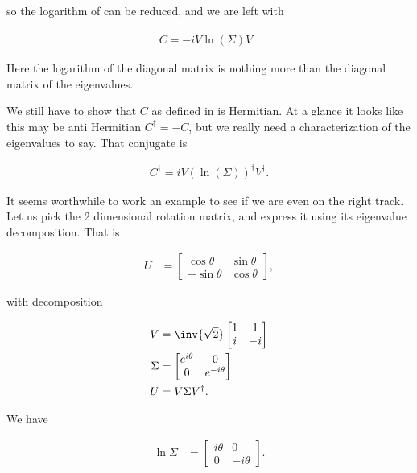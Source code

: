 so the logarithm of  can be reduced, and we are left with

\begin{align}\label{eqn:desaiDiracNotes:11}
C = -i V \ln ( \Sigma ) V^\dagger.
\end{align}

Here the logarithm of the diagonal matrix is nothing more than the diagonal matrix of the eigenvalues.

We still have to show that $C$ as defined in  is Hermitian.  At a glance it looks like this may be anti Hermitian $C^\dagger = -C$, but we really need a characterization of the eigenvalues to say.  That conjugate is

\begin{align}\label{eqn:desaiDiracNotes:11b}
C^\dagger = i V (\ln ( \Sigma ))^\dagger V^\dagger.
\end{align}

It seems worthwhile to work an example to see if we are even on the right track.  Let us pick the 2 dimensional rotation matrix, and express it using its eigenvalue decomposition.  That is

\begin{align}\label{eqn:desaiDiracNotes:12}
U &= 
\begin{bmatrix}
\cos\theta & \sin\theta \\
-\sin\theta & \cos\theta
\end{bmatrix},
\end{align}

with decomposition

\begin{align}\label{eqn:desaiDiracNotes:12b}
V &= \inv{\sqrt{2}} 
\begin{bmatrix}
1 & 1 \\
i & -i \\
\end{bmatrix} \\
\Sigma &= 
\begin{bmatrix}
e^{i\theta} & 0 \\
0 & e^{-i\theta} 
\end{bmatrix} \\
U &= V \Sigma V^\dagger.
\end{align}

We have

\begin{align*}
\ln \Sigma &=
\begin{bmatrix}
i\theta & 0 \\
0 & -i\theta 
\end{bmatrix}.
\end{align*}

